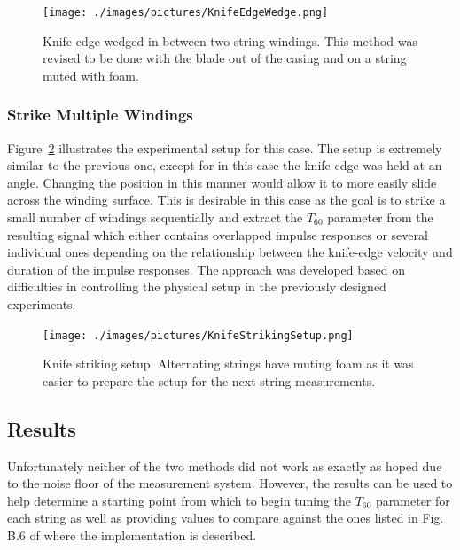 \documentclass[../main.tex]{subfiles}
\begin{document}
\begin{figure}[h]
    \centering
    \texttt{[image: ./images/pictures/KnifeEdgeWedge.png]}
    \caption{Knife edge wedged in between two string windings. This method was revised to be done with the blade out of the casing and on a string muted with foam.}
    \label{fig:KnifeEdgeWedge}
\end{figure}

\subsubsection{Strike Multiple Windings}
Figure~\ref{fig:KnifeStrikingSetup} illustrates the experimental setup for this case. The setup is extremely similar to the previous one, except for in this case the knife edge was held at an angle. Changing the position in this manner would allow it to more easily slide across the winding surface. This is desirable in this case as the goal is to strike a small number of windings sequentially and extract the $T_{60}$ parameter from the resulting signal which either contains overlapped impulse responses or several individual ones depending on the relationship between the knife-edge velocity and duration of the impulse responses. The approach was developed based on difficulties in controlling the physical setup in the previously designed experiments.

\begin{figure}[h]
    \centering
    \texttt{[image: ./images/pictures/KnifeStrikingSetup.png]}
    \caption{Knife striking setup. Alternating strings have muting foam as it was easier to prepare the setup for the next string measurements.}
    \label{fig:KnifeStrikingSetup}
\end{figure}

\subsection{Results}
\label{sec:T60Measurement}
Unfortunately neither of the two methods did not work as exactly as hoped due to the noise floor of the measurement system. However, the results can be used to help determine a starting point from which to begin tuning the $T_{60}$ parameter for each string as well as providing values to compare against the ones listed in Fig. B.6 of \cite{puputti_real-time_2010} where the implementation is described.
\end{document}
